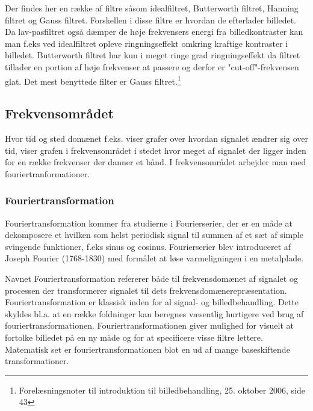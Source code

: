 Der findes her en række af filtre såsom idealfiltret, Butterworth filtret, Hanning filtret og Gauss filtret. Forskellen i disse filtre er hvordan de efterlader billedet. Da lav-pasfiltret også dæmper de høje frekvensers energi fra billedkontraster kan man f.eks ved idealfiltret opleve ringningseffekt omkring kraftige kontraster i billedet. Butterworth filtret har kun i meget ringe grad ringningseffekt da filtret tillader en portion af høje frekvenser at passere og derfor er "cut-off"-frekvensen glat. Det mest benyttede filter er Gauss filtret.\footnote{Forelæsningsnoter til introduktion til billedbehandling, 25. oktober 2006, side 43}

\subsection{Frekvensområdet}
Hvor tid og sted domænet f.eks. viser grafer over hvordan signalet ændrer sig over tid, viser grafen i frekvensområdet i stedet hvor meget af signalet der ligger inden for en række frekvenser der danner et bånd. I frekvensområdet arbejder man med fouriertranformationer.

\subsubsection{Fouriertransformation}
Fouriertransformation kommer fra studierne i Fourierserier, der er en måde at dekomposere et hvilken som helst periodisk signal til summen af et sæt af simple svingende funktioner, f.eks sinus og cosinus. Fourierserier blev introduceret af Joseph Fourier (1768-1830) med formålet at løse varmeligningen i en metalplade.

Navnet Fouriertransformation refererer både til frekvensdomænet af signalet og processen der transformerer signalet til dets frekvensdomænerepræsentation. Fouriertransformation er klassisk inden for al signal- og billedbehandling. Dette skyldes bl.a. at en række foldninger kan beregnes væsentlig hurtigere ved brug af fouriertransformationen. Fouriertransformationen giver mulighed for visuelt at fortolke billedet på en ny måde og for at specificere visse filtre lettere. Matematisk set er fouriertransformationen blot en ud af mange baseskiftende transformationer.




  
 
